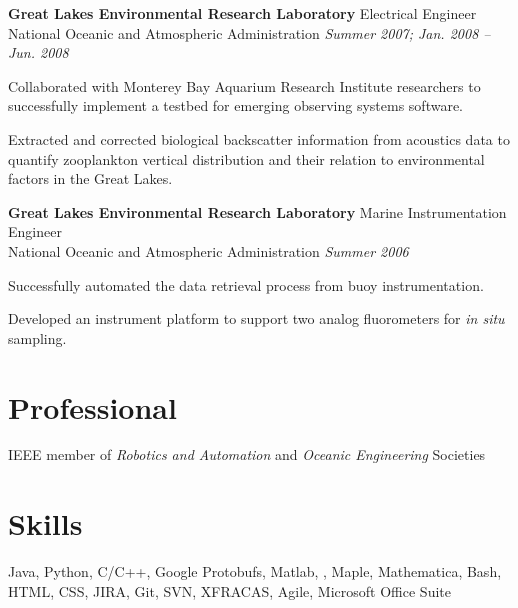 \documentclass[article]{resume}
\begin{document}
{    \textbf{Great Lakes Environmental Research Laboratory } \hfill  Electrical Engineer \\ 
	National Oceanic and Atmospheric Administration \hfill \textsl{Summer 2007; Jan. 2008 -- Jun. 2008}  \\
    \vspace{ -2 mm}	
    \begin{list2}
	\item Collaborated with Monterey Bay Aquarium Research Institute researchers to successfully implement a testbed for emerging 	observing systems software.
	\item Extracted and corrected biological backscatter information from acoustics data to quantify zooplankton vertical distribution and 	their relation to environmental factors in the Great Lakes.
    \end{list2}\vspace{-2mm}

    \textbf{Great Lakes Environmental Research Laboratory } \hfill Marine Instrumentation Engineer  \\ 
	National Oceanic and Atmospheric Administration \hfill \textsl{Summer 2006} \\
    \vspace{ -2 mm}	
    \begin{list2}
	\item Successfully automated the data retrieval process from buoy instrumentation.
	\item Developed an instrument platform to support two analog fluorometers for \textit{in situ} sampling.
    \end{list2}

    \section{Professional} 
    
    IEEE member of \textsl{Robotics and Automation} and \textsl{Oceanic Engineering} Societies  
	    
    \section{Skills} 

    Java, Python, C/C++, Google Protobufs, Matlab, \LaTeXe, Maple, Mathematica, Bash, HTML, CSS, JIRA, Git, SVN, XFRACAS, Agile, Microsoft Office Suite

}
\end{document}
